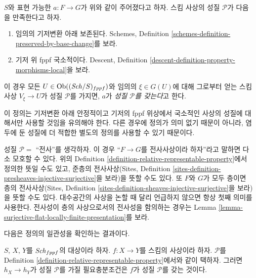 \begin{definition}
\label{definition-relative-representable-property}
$S$와 표현 가능한 $a : F \to G$가 위와 같이 주어졌다고 하자.
스킴 사상의 성질 $\mathcal{P}$가 다음을 만족한다고 하자.
\begin{enumerate}
\item 임의의 기저변환 아래 보존된다. Schemes, Definition
\ref{schemes-definition-preserved-by-base-change}를 보라.
\item 기저 위 fppf 국소적이다. Descent, Definition
\ref{descent-definition-property-morphisms-local}을 보라.
\end{enumerate}
이 경우 모든 $U \in \mathop{\mathrm{Ob}}\nolimits((\mathit{Sch}/S)_{fppf})$와 임의의
$\xi \in G(U)$에 대해 그로부터 얻는 스킴 사상 $V_\xi \to U$가
성질 $\mathcal{P}$를 가지면, $a$가 {\it 성질 $\mathcal{P}$를 갖는다}고
한다.
\end{definition}

\noindent
이 정의는 기저변환 아래 안정적이고 기저의 fppf 위상에서 국소적인
사상의 성질에 대해서만 사용할 것임을 유의해야 한다. 다른 경우에
정의가 의미 없기 때문이 아니라, 염두에 둔 성질에 더 적합한 별도의
정의를 사용할 수 있기 때문이다.

\begin{remark}
\label{remark-warning}
성질 $\mathcal{P}=$ ``전사''를 생각하자. 이 경우 ``$F \to G$를
전사사상이라 하자''라고 말하면 다소 모호할 수 있다. 위의
Definition \ref{definition-relative-representable-property}에서 정의한
뜻일 수도 있고, 준층의 전사사상(Sites, Definition
\ref{sites-definition-presheaves-injective-surjective}을 보라)을 뜻할
수도 있다. 또 $F$와 $G$가 모두 층이면 층의 전사사상(Sites, Definition
\ref{sites-definition-sheaves-injective-surjective}을 보라)을 뜻할 수도
있다. 대수공간의 사상을 논할 때 달리 언급하지 않으면 항상 첫째 의미를
사용한다. 전사성이 층의 사상으로서의 전사성을 함의하는 경우는
Lemma \ref{lemma-surjective-flat-locally-finite-presentation}를 보라.
\end{remark}

\noindent
다음은 정의의 일관성을 확인하는 결과이다.

\begin{lemma}
\label{lemma-morphism-schemes-gives-representable-transformation-property}
$S$, $X$, $Y$를 $\mathit{Sch}_{fppf}$의 대상이라 하자.
$f : X \to Y$를 스킴의 사상이라 하자.
$\mathcal{P}$를 Definition
\ref{definition-relative-representable-property}에서와 같이 택하자.
그러면 $h_X \longrightarrow h_Y$가 성질 $\mathcal{P}$를 가질 필요충분조건은
$f$가 성질 $\mathcal{P}$를 갖는 것이다.
\end{lemma}

